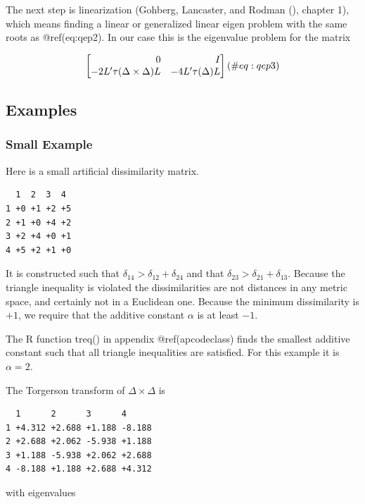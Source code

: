 \documentclass[
  12pt,
  letterpaper,
  DIV=11,
  numbers=noendperiod]{scrreprt}
\theoremstyle{remark}
\begin{document}
The next step is linearization (Gohberg, Lancaster, and Rodman
(), chapter 1), which
means finding a linear or generalized linear eigen problem with the same
roots as @ref(eq:qep2). In our case this is the eigenvalue problem for
the matrix

\begin{equation}
\begin{bmatrix}
\hfill 0&\hfill I\\
-2L'\tau(\Delta\times\Delta)L&-4L'\tau(\Delta)L
\end{bmatrix}
(\#eq:qep3)
\end{equation}

\subsection{Examples}\label{examples}

\subsubsection{Small Example}\label{small-example}

Here is a small artificial dissimilarity matrix.

\begin{verbatim}
  1  2  3  4 
1 +0 +1 +2 +5
2 +1 +0 +4 +2
3 +2 +4 +0 +1
4 +5 +2 +1 +0
\end{verbatim}

It is constructed such that \(\delta_{14}>\delta_{12}+\delta_{24}\) and
that \(\delta_{23}>\delta_{21}+\delta_{13}\). Because the triangle
inequality is violated the dissimilarities are not distances in any
metric space, and certainly not in a Euclidean one. Because the minimum
dissimilarity is \(+1\), we require that the additive constant
\(\alpha\) is at least \(-1\).

The R function treq() in appendix @ref(apcodeclass) finds the smallest
additive constant such that all triangle inequalities are satisfied. For
this example it is \(\alpha=2\).

The Torgerson transform of \(\Delta\times\Delta\) is

\begin{verbatim}
  1      2      3      4     
1 +4.312 +2.688 +1.188 -8.188
2 +2.688 +2.062 -5.938 +1.188
3 +1.188 -5.938 +2.062 +2.688
4 -8.188 +1.188 +2.688 +4.312
\end{verbatim}

with eigenvalues
\end{document}
